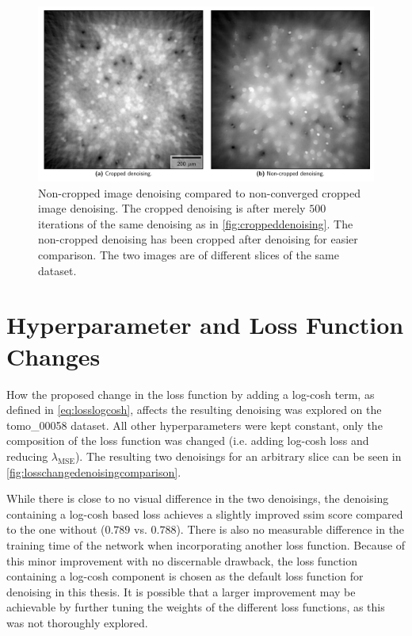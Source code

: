 \begin{figure}[htbp]
  \centering
  \includegraphics[width=.9\textwidth]{figures/croppednoncroppedearly.pdf}
  \caption[Non-cropped image denoising compared to non-converged cropped image denoising]{Non-cropped image denoising compared to non-converged cropped image denoising. The cropped denoising is after merely $500$ iterations of the same denoising as in \cref{fig:croppeddenoising}. The non-cropped denoising has been cropped after denoising for easier comparison. The two images are of different slices of the same dataset. }
  \label{fig:croppednoncroppedearly}
\end{figure}

\section{Hyperparameter and Loss Function Changes}

How the proposed change in the loss function by adding a log-cosh term, as defined in \cref{eq:losslogcosh}, affects the resulting denoising was explored on the tomo\_00058 dataset. All other hyperparameters were kept constant, only the composition of the loss function was changed (i.e. adding log-cosh loss and reducing $\lambda_{\text{MSE}}$). The resulting two denoisings for an arbitrary slice can be seen in \cref{fig:losschangedenoisingcomparison}. 

While there is close to no visual difference in the two denoisings, the denoising containing a log-cosh based loss achieves a slightly improved \acrshort{ssim} score compared to the one without ($0.789$ vs. $0.788$). There is also no measurable difference in the training time of the network when incorporating another loss function. Because of this minor improvement with no discernable drawback, the loss function containing a log-cosh component is chosen as the default loss function for denoising in this thesis. It is possible that a larger improvement may be achievable by further tuning the weights of the different loss functions, as this was not thoroughly explored. 

